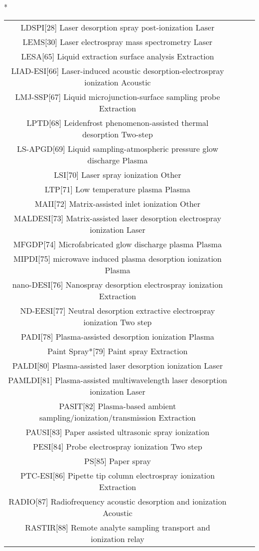 \begin{table}{*}
\begin{tabular}{|c|c|c|l|}
LDSPI[28] Laser desorption spray post-ionization Laser \\ 
LEMS[30] Laser electrospray mass spectrometry Laser \\
LESA[65] Liquid extraction surface analysis Extraction \\
LIAD-ESI[66] Laser-induced acoustic desorption-electrospray ionization Acoustic \\
LMJ-SSP[67] Liquid microjunction-surface sampling probe Extraction \\
LPTD[68] Leidenfrost phenomenon-assisted thermal desorption Two-step \\
LS-APGD[69] Liquid sampling-atmospheric pressure glow discharge Plasma \\
LSI[70] Laser spray ionization Other \\
LTP[71] Low temperature plasma Plasma \\
MAII[72] Matrix-assisted inlet ionization Other \\
MALDESI[73] Matrix-assisted laser desorption electrospray ionization Laser \\
MFGDP[74] Microfabricated glow discharge plasma Plasma \\
MIPDI[75] microwave induced plasma desorption ionization Plasma \\
nano-DESI[76] Nanospray desorption electrospray ionization Extraction \\
ND-EESI[77] Neutral desorption extractive electrospray ionization Two step \\
PADI[78] Plasma-assisted desorption ionization Plasma \\
Paint Spray*[79] Paint spray Extraction \\
PALDI[80] Plasma-assisted laser desorption ionization Laser \\
PAMLDI[81] Plasma-assisted multiwavelength laser desorption ionization Laser \\
PASIT[82] Plasma-based ambient sampling/ionization/transmission Extraction \\
PAUSI[83] Paper assisted ultrasonic spray ionization  \\
PESI[84] Probe electrospray ionization Two step \\
PS[85] Paper spray  \\
PTC-ESI[86] Pipette tip column electrospray ionization Extraction \\
RADIO[87] Radiofrequency acoustic desorption and ionization Acoustic \\
RASTIR[88] Remote analyte sampling transport and ionization relay \\ 

\end{tabular}
\end{table}
